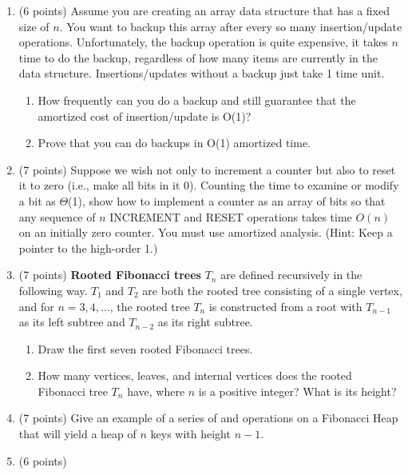 \documentclass[12pt]{report}
\begin{document}
\maketitle
\begin{enumerate}[label=\arabic*.]
	\item (6 points) Assume you are creating an array data structure that has a fixed size of $n$. You want to backup this array after every so many insertion/update operations. Unfortunately, the backup operation is quite expensive, it takes $n$ time to do the backup, regardless of how many items are currently in the data structure. Insertions/updates without a backup just take 1 time unit.
	\begin{enumerate}[label=\arabic{enumi}\alph*)]
	    \item How frequently can you do a backup and still guarantee that the amortized cost of insertion/update is O(1)?
		\item Prove that you can do backups in O(1) amortized time.
	\end{enumerate}
	\item (7 points) Suppose we wish not only to increment a counter but also to reset it to zero (i.e., make all bits in it 0). Counting the time to examine or modify a bit as $\Theta$(1), show how to implement a counter as an array of bits so that any sequence of $n$ INCREMENT and RESET operations takes time $O(n)$ on an initially zero counter. You must use amortized analysis. (Hint: Keep a pointer to the high-order 1.)
	\item (7 points) \textbf{Rooted Fibonacci trees} $T_{n}$ are defined recursively in the following way. $T_{1}$ and $T_{2}$ are both the rooted tree consisting of a single vertex, and for $n=3,4,\dots$, the rooted tree $T_{n}$ is constructed from a root with $T_{n-1}$ as its left subtree and $T_{n-2}$ as its right subtree.
	\begin{enumerate}[label=\arabic{enumi}\alph*)]
	    \item Draw the first seven rooted Fibonacci trees.
		\item How many vertices, leaves, and internal vertices does the rooted Fibonacci tree $T_{n}$ have, where $n$ is a positive integer? What is its height?
	\end{enumerate}
	\item (7 points) Give an example of a series of  and  operations on a Fibonacci Heap that will yield a heap of $n$ keys with height $n-1$.
	\item (6 points)

\end{enumerate}
\end{document}
